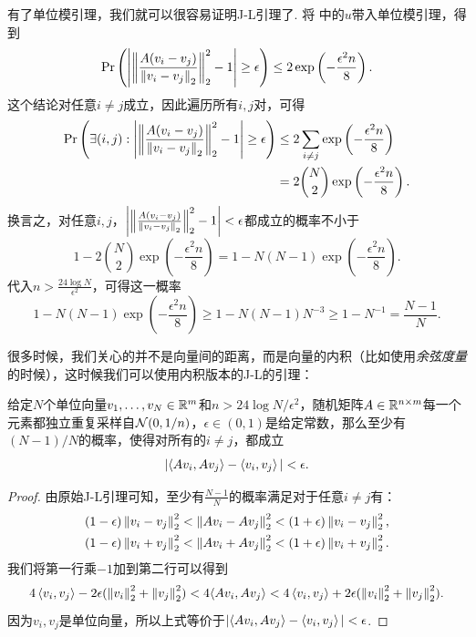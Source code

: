 有了单位模引理，我们就可以很容易证明J-L引理了. 将 中的$u$带入单位模引理，得到
\[
    \Pr\left(\left|\left\|\frac{A(v_i-v_j)}{\left\|v_i-v_j\right\|_2}\right\|_2^2 - 1 \right| \geq \epsilon\right)\leq  2\exp \left(-\frac{\epsilon^2 n}{8}\right). 
\]
这个结论对任意$i\neq j$成立，因此遍历所有$i,j$对，可得
\[
\begin{aligned}
    \Pr\left(\exists (i,j): \left|\left\|\frac{A(v_i-v_j)}{\left\|v_i-v_j\right\|_2}\right\|_2^2 - 1 \right| \geq \epsilon\right)
    &\leq 2 \sum_{i\neq j} \exp \left(-\frac{\epsilon^2 n}{8}\right) \\
    &=  2  \binom{N}{2}\exp \left(-\frac{\epsilon^2 n}{8}\right). 
\end{aligned}
\]
换言之，对任意$i,j$，$\left|\left\|\frac{A(v_i-v_j)}{\left\|v_i-v_j\right\|_2}\right\|_2^2 - 1 \right| < \epsilon$都成立的概率不小于
\[
1 - 2  \binom{N}{2}\exp \left(-\frac{\epsilon^2 n}{8}\right) = 1 - N(N-1)\exp \left(-\frac{\epsilon^2 n}{8}\right). 
\]
代入$n > \frac{24\log N}{\epsilon^2}$，可得这一概率
\[
1 - N(N-1)\exp \left(-\frac{\epsilon^2 n}{8}\right) \geq 1 - N(N-1)N^{-3}\geq 1 - N^{-1} = \frac{N-1}{N}. 
\]

很多时候，我们关心的并不是向量间的距离，而是向量的内积（比如使用\textit{余弦度量}的时候），这时候我们可以使用内积版本的J-L的引理：
\begin{theorem}\label{thm:johnson-lindenstrauss-lemma-inner-product}
    给定$N$个单位向量$v_1,\dots,v_N\in\mathbb{R}^m$和$n > 24\log N/\epsilon^2$，随机矩阵$A\in \mathbb{R}^{n\times m}$每一个元素都独立重复采样自$\mathcal{N}(0,1/n)$，$\epsilon \in (0,1)$是给定常数，那么至少有$(N-1)/N$的概率，使得对所有的$i\neq j$，都成立
    \[
        |\langle Av_i, Av_j\rangle - \left\langle{v_i},{v_j}\right\rangle|< \epsilon.
    \]
\end{theorem}    
\begin{proof}
由原始J-L引理可知，至少有$\frac{N-1}{N}$的概率满足对于任意$i\neq j$有：
    \[
    \begin{aligned}
        &(1 - \epsilon)\left\|v_i-v_j\right\|_2^2 < \left\|Av_i-Av_j\right\|_2^2< (1 + \epsilon)\left\|v_i-v_j\right\|_2^2, \\
        &(1 - \epsilon)\left\|v_i+v_j\right\|_2^2 < \left\|Av_i+Av_j\right\|_2^2 < (1 + \epsilon)\left\|v_i+v_j\right\|_2^2. 
    \end{aligned}
    \]
我们将第一行乘$-1$加到第二行可以得到
    \[
        4\left\langle{v_i},{v_j}\right\rangle - 2 \epsilon (\left\|v_i\right\|_2^2 + \left\|v_j\right\|_2^2) <4\langle Av_i, Av_j\rangle < 4\left\langle{v_i},{v_j}\right\rangle + 2 \epsilon (\left\|v_i\right\|_2^2 + \left\|v_j\right\|_2^2).
    \]
因为$v_i,v_j$是单位向量，所以上式等价于$|\langle Av_i, Av_j\rangle - \left\langle{v_i},{v_j}\right\rangle|<\epsilon$. 
\end{proof}

